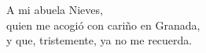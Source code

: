 \thispagestyle{empty}
{}

\vspace*{3cm}

\begin{flushright}
    A mi abuela Nieves, \\
    quien me acogió con cariño en Granada, \\
    y que, tristemente, ya no me recuerda.
\end{flushright}
\newpage
\thispagestyle{empty}
\clearpage\null\newpage